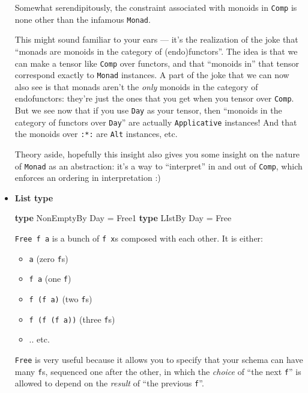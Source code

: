 \documentclass[]{article}
\newenvironment{Shaded}{}{}
\newcommand{\DataTypeTok}[1]{\textcolor[rgb]{0.56,0.13,0.00}{#1}}
\newcommand{\KeywordTok}[1]{\textcolor[rgb]{0.00,0.44,0.13}{\textbf{#1}}}
\newcommand{\OtherTok}[1]{\textcolor[rgb]{0.00,0.44,0.13}{#1}}
\begin{document}
\begin{itemize}
  Somewhat serendipitously, the constraint associated with monoids in
  \texttt{Comp} is none other than the infamous \texttt{Monad}.

  This might sound familiar to your ears --- it's the realization of the joke
  that ``monads are monoids in the category of (endo)functors''. The idea is
  that we can make a tensor like \texttt{Comp} over functors, and that ``monoids
  in'' that tensor correspond exactly to \texttt{Monad} instances. A part of the
  joke that we can now also see is that monads aren't the \emph{only} monoids in
  the category of endofunctors: they're just the ones that you get when you
  tensor over \texttt{Comp}. But we see now that if you use \texttt{Day} as your
  tensor, then ``monoids in the category of functors over \texttt{Day}'' are
  actually \texttt{Applicative} instances! And that the monoids over
  \texttt{:*:} are \texttt{Alt} instances, etc.

  Theory aside, hopefully this insight also gives you some insight on the nature
  of \texttt{Monad} as an abstraction: it's a way to ``interpret'' in and out of
  \texttt{Comp}, which enforces an ordering in interpretation :)
\item
  \textbf{List type}

\begin{Shaded}
\begin{Highlighting}[]
\KeywordTok{type} \DataTypeTok{NonEmptyBy} \DataTypeTok{Day} \OtherTok{=} \DataTypeTok{Free1}
\KeywordTok{type} \DataTypeTok{LIstBy}     \DataTypeTok{Day} \OtherTok{=} \DataTypeTok{Free}
\end{Highlighting}
\end{Shaded}

  \texttt{Free\ f\ a} is a bunch of \texttt{f\ x}s composed with each other. It
  is either:

  \begin{itemize}
  \tightlist
  \item
    \texttt{a} (zero \texttt{f}s)
  \item
    \texttt{f\ a} (one \texttt{f})
  \item
    \texttt{f\ (f\ a)} (two \texttt{f}s)
  \item
    \texttt{f\ (f\ (f\ a))} (three \texttt{f}s)
  \item
    .. etc.
  \end{itemize}

  \texttt{Free} is very useful because it allows you to specify that your schema
  can have many \texttt{f}s, sequenced one after the other, in which the
  \emph{choice} of ``the next \texttt{f}'' is allowed to depend on the
  \emph{result} of ``the previous \texttt{f}''.


\end{itemize}
\end{document}
